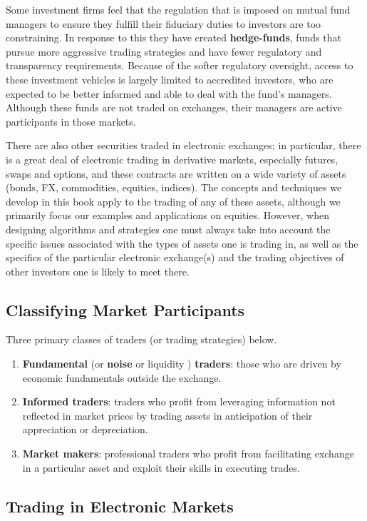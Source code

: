 \documentclass[11pt]{article}
\begin{document}
Some investment firms feel that the regulation that is imposed on mutual fund managers to ensure they
fulfill their fiduciary duties to investors are too constraining. In response to this they have
created \textbf{hedge-funds}, funds that pursue more aggressive trading strategies and have fewer regulatory
and transparency requirements. Because of the softer regulatory oversight, access to these investment
vehicles is largely limited to accredited investors, who are expected to be better informed and able
to deal with the fund's managers. Although these funds are not traded on exchanges, their managers are
active participants in those markets.

There are also other securities traded in electronic exchanges; in particular, there is a great deal
of electronic trading in derivative markets, especially futures, swaps and options, and these
contracts are written on a wide variety of assets (bonds, FX, commodities, equities, indices). The
concepts and techniques we develop in this book apply to the trading of any of these assets, although
we primarily focus our examples and applications on equities. However, when designing algorithms and
strategies one must always take into account the specific issues associated with the types of assets
one is trading in, as well as the specifics of the particular electronic exchange(s) and the trading
objectives of other investors one is likely to meet there.
\subsection{Classifying Market Participants}
\label{sec:org1e69402}
Three primary classes of traders (or trading strategies) below.
\begin{enumerate}
\item \textbf{Fundamental} (or \textbf{noise} or liquidity ) \textbf{traders}: those who are driven by economic fundamentals outside the exchange.
\item \textbf{Informed traders}: traders who profit from leveraging information not reflected in market prices by
trading assets in anticipation of their appreciation or depreciation.
\item \textbf{Market makers}: professional traders who profit from facilitating exchange in a particular asset and
exploit their skills in executing trades.
\end{enumerate}
\subsection{Trading in Electronic Markets}
\label{sec:orgf1573d4}
\end{document}

